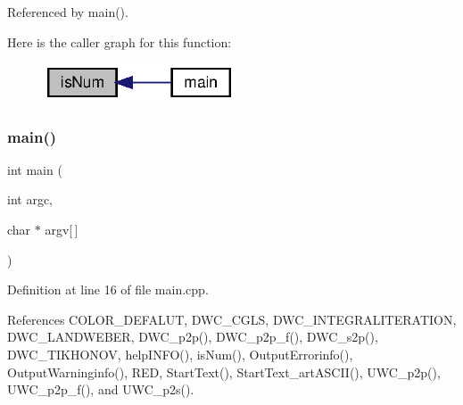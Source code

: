 Referenced by main().

Here is the caller graph for this function\+:\nopagebreak
\begin{figure}[H]
\begin{center}
\leavevmode
\includegraphics[width=162pt]{main_8cpp_adab29bff9da0db53a1c9a47fed7144bb_adab29bff9da0db53a1c9a47fed7144bb_icgraph}
\end{center}
\end{figure}
\mbox{\label{main_8cpp_a0ddf1224851353fc92bfbff6f499fa97_a0ddf1224851353fc92bfbff6f499fa97}} 
\subsubsection{main()}
{\footnotesize\ttfamily int main (\begin{DoxyParamCaption}\item[{int}]{argc,  }\item[{char $\ast$}]{argv[$\,$] }\end{DoxyParamCaption})}



Definition at line 16 of file main.\+cpp.



References C\+O\+L\+O\+R\+\_\+\+D\+E\+F\+A\+L\+UT, D\+W\+C\+\_\+\+C\+G\+LS, D\+W\+C\+\_\+\+I\+N\+T\+E\+G\+R\+A\+L\+I\+T\+E\+R\+A\+T\+I\+ON, D\+W\+C\+\_\+\+L\+A\+N\+D\+W\+E\+B\+ER, D\+W\+C\+\_\+p2p(), D\+W\+C\+\_\+p2p\+\_\+f(), D\+W\+C\+\_\+s2p(), D\+W\+C\+\_\+\+T\+I\+K\+H\+O\+N\+OV, help\+I\+N\+F\+O(), is\+Num(), Output\+Errorinfo(), Output\+Warninginfo(), R\+ED, Start\+Text(), Start\+Text\+\_\+art\+A\+S\+C\+I\+I(), U\+W\+C\+\_\+p2p(), U\+W\+C\+\_\+p2p\+\_\+f(), and U\+W\+C\+\_\+p2s().

